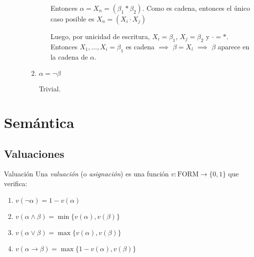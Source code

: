 \begin{itemize}
\begin{itemize}
\begin{enumerate}
\begin{itemize}
                            Entonces $\alpha = X_n = (\beta_1 * \beta_2)$.
                            Como es cadena, entonces el único caso posible
                            es $X_n = (X_i \cdot X_j)$ %

                            Luego, por unicidad de escritura, $X_i = \beta_1$,
                            $X_j = \beta_2$ y $\cdot = *$.
                            Entonces $X_1, \dotsc, X_i = \beta_1$ es cadena
                            $\implies$ $\beta = X_l$ %
                            $\implies$ $\beta$ aparece en la cadena de
                            $\alpha$.
                    \end{itemize}
                \item $\alpha = \neg \beta$

                    Trivial.
            \end{enumerate}
    \end{itemize}

\end{itemize}

\pagebreak
\section{Semántica}

\subsection{Valuaciones}


\begin{definicion}{Valuación}{}
    Una \textit{valuación} (o \textit{asignación}) es una función 
    $v: \mathrm{FORM} \to \{ 0,1 \}$ que verifica:

    \begin{enumerate}[label=\protect\circled{\arabic*}]
        \item {}%
            $v (\neg \alpha) = 1 - v (\alpha)$
        \item {}%
            $v(\alpha \wedge \beta) = \min \{ v(\alpha), v(\beta) \}$
        \item {}%
            $v(\alpha \vee \beta) 
            = \max \{ v(\alpha), v(\beta) \}$
        \item {}%
            $v (\alpha \to \beta) 
            = \max\{ 1-v(\alpha), v(\beta) \}$
    \end{enumerate}
\end{definicion}

